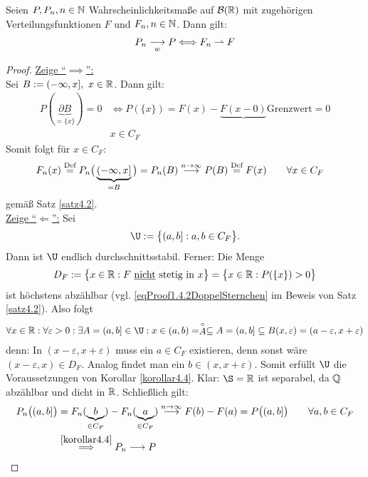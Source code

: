 \begin{korollar}\label{korollar4.5}
Seien $P,P_n,n\in\mathbb{N}$ Wahrscheinlichkeitsmaße auf $\mathcal{B}(\mathbb{R})$ mit zugehörigen Verteilungsfunktionen $F$ und $F_n,n\in\mathbb{N}$. Dann gilt:
\begin{align*}
P_n\underset{w}{\overset{}{\longrightarrow}}P
\Longleftrightarrow
F_n\rightharpoonup F
\end{align*}
\end{korollar}
\begin{proof}
\underline{Zeige ``$\implies$'':}\\
Sei $B:=(-\infty,x],~x\in\mathbb{R}$. Dann gilt:
\begin{align*}
P(\underbrace{\partial B}_{=\lbrace x\rbrace})=0
&\Longleftrightarrow P(\lbrace x\rbrace)=F(x)-\underbrace{F(x-0)}{\text{Grenzwert}}=0\\
& x\in C_F
\end{align*}
Somit folgt für $x\in C_F$:
\begin{align*}
F_n(x)&\stackrel{\text{Def}}{=}
P_n\big(\underbrace{(-\infty,x]}_{=B}\big)=P_n(B)\stackrel{n\to\infty}{\longrightarrow} P(B)\stackrel{\text{Def}}{=} F(x)\qquad\forall x\in C_F
\end{align*}
gemäß Satz \ref{satz4.2}.\\

\underline{Zeige ``$\Longleftarrow$'':} Sei
\begin{align*}
\U:=\big\lbrace (a,b]:a,b\in C_F\big\rbrace.
\end{align*}
Dann ist $\U$ endlich durchschnittsstabil. Ferner: Die Menge 
\begin{align*}
D_F:=\big\lbrace x\in\mathbb{R}: F\text{ \underline{nicht} stetig in }x\big\rbrace
=\big\lbrace x\in\mathbb{R}:P(\lbrace x\rbrace)>0\big\rbrace
\end{align*}
ist höchstens abzählbar (vgl. \eqref{eqProof1.4.2DoppelSternchen} 
im Beweis von Satz \ref{satz4.2}). Also folgt
\begin{align*}
\forall x\in\R:\forall\varepsilon>0:\exists A=(a,b]\in\U:x\in (a,b)=\stackrel{\circ}{A}\subseteq A=(a,b]\subseteq B(x,\varepsilon)=(a-\varepsilon,x+\varepsilon)
\end{align*}
denn: In $(x-\varepsilon,x+\varepsilon)$ muss ein $a\in C_F$ existieren, denn sonst wäre $(x-\varepsilon, x)\in D_F$. Analog findet man ein $b\in(x,x+\varepsilon)$. Somit erfüllt $\U$ die Voraussetzungen von Korollar \ref{korollar4.4}. Klar: $\S=\R$ ist separabel, da $\mathbb{Q}$ abzählbar und dicht in $\mathbb{R}$. Schließlich gilt:
\begin{align*}
P_n\big((a,b]\big)&=
F_n(\underbrace{b}_{\in C_F})-F_n(\underbrace{a}_{\in C_F})\stackrel{n\to\infty}{\longrightarrow} F(b)-F(a)=P\big((a,b]\big)\qquad\forall a,b\in C_F\\
&\stackrel{\ref{korollar4.4}}{\implies}
P_n\longrightarrow P
\end{align*}
\end{proof}

